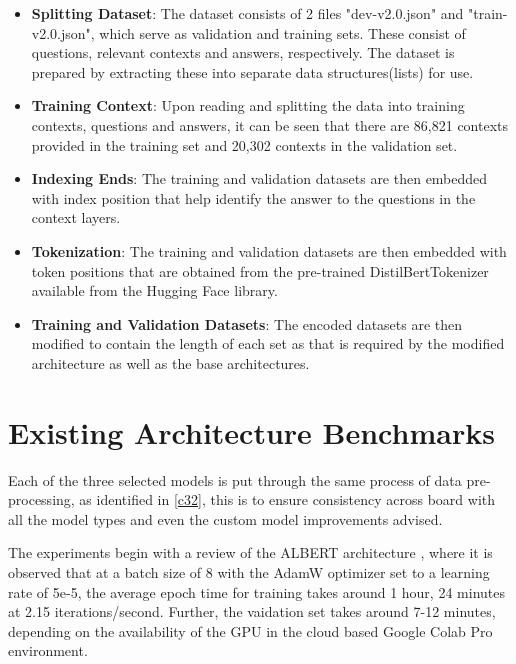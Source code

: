 \documentclass[a4paper,12pt]{report}
\begin{document}
        \begin{itemize}
        	\item \textbf{Splitting Dataset}: The dataset consists of 2 files "dev-v2.0.json" and "train-v2.0.json", which serve as validation and training sets. These consist of questions, relevant contexts and answers, respectively. The dataset is prepared by extracting these into separate data structures(lists) for use.
        	\item \textbf{Training Context}: Upon reading and splitting the data into training contexts, questions and answers, it can be seen that there are 86,821 contexts provided in the training set and 20,302 contexts in the validation set.
        	\item \textbf{Indexing Ends}: The training and validation datasets are then embedded with index position that help identify the answer to the questions in the context layers.
        	\item \textbf{Tokenization}: The training and validation datasets are then embedded with token positions that are obtained from the pre-trained DistilBertTokenizer available from the Hugging Face library.
        	\item \textbf{Training and Validation Datasets}: The encoded datasets are then modified to contain the length of each set as that is required by the modified architecture as well as the base architectures.
        \end{itemize}


     \section{Existing Architecture Benchmarks}\label{c51}

     	Each of the three selected models is put through the same process of data pre-processing, as identified in \ref{c32}, this is to ensure consistency across board with all the model types and even the custom model improvements advised.

    	The experiments begin with a review of the ALBERT architecture \citep{albert}, where it is observed that at a batch size of 8 with the AdamW optimizer set to a learning rate of 5e-5, the average epoch time for training takes around 1 hour, 24 minutes at 2.15 iterations/second. Further, the vaidation set takes around 7-12 minutes, depending on the availability of the GPU in the cloud based Google Colab Pro environment.
\end{document}
